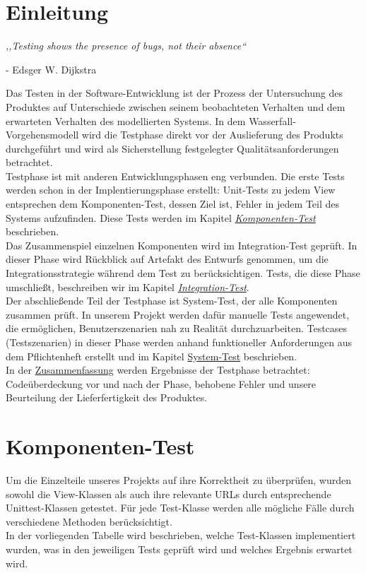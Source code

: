 \documentclass[parskip=full,11pt]{scrartcl}
\begin{document}
 \section{Einleitung}
\begin{center}
\textit{,,Testing shows the presence of bugs, not their absence``}
\end{center}
\begin{flushright}
- Edsger W. Dijkstra\\
\end{flushright}
Das Testen in der Software-Entwicklung ist der Prozess der Untersuchung des Produktes auf Unterschiede zwischen seinem beobachteten Verhalten und dem erwarteten Verhalten des modellierten Systems.
In dem Wasserfall-Vorgehensmodell wird die Testphase direkt vor der Auslieferung des Produkts durchgeführt und wird als Sicherstellung festgelegter Qualitätsanforderungen betrachtet.\\
Testphase ist mit anderen Entwicklungsphasen eng verbunden. Die erste Tests werden schon in der Implentierungsphase erstellt: Unit-Tests zu jedem View entsprechen dem Komponenten-Test, dessen Ziel ist, Fehler in jedem Teil des Systems aufzufinden. Diese Tests werden im Kapitel \hyperref[komponententest]{\textit{Komponenten-Test}} beschrieben.\\
Das Zusammenspiel einzelnen Komponenten wird im Integration-Test geprüft. In dieser Phase wird Rückblick auf Artefakt des Entwurfs genommen, um die Integrationsstrategie während dem Test zu berücksichtigen. Tests, die diese Phase umschließt, beschreiben wir im Kapitel \hyperref[integrationtest]{\textit{Integration-Test}}.\\
Der abschließende Teil der Testphase ist System-Test, der alle Komponenten zusammen prüft. In unserem Projekt werden dafür manuelle Tests angewendet, die ermöglichen, Benutzerszenarien nah zu Realität durchzuarbeiten. Testcases (Testszenarien) in dieser Phase werden anhand funktioneller Anforderungen aus dem Pflichtenheft erstellt und im Kapitel \hyperref[systemtest]{System-Test} beschrieben.\\
In der \hyperref[zusammenfassung]{Zusammenfassung} werden Ergebnisse der Testphase betrachtet: Codeüberdeckung vor und nach der Phase, behobene Fehler und unsere Beurteilung der Lieferfertigkeit des Produktes.
 \newpage
\section{Komponenten-Test} \label{komponententest}
Um die Einzelteile unseres Projekts auf ihre Korrektheit zu überprüfen, wurden sowohl die View-Klassen als auch ihre relevante URLs durch entsprechende Unittest-Klassen getestet. Für jede Test-Klasse werden alle mögliche Fälle durch verschiedene Methoden berücksichtigt.\\
In der vorliegenden Tabelle wird beschrieben, welche Test-Klassen implementiert wurden, was in den jeweiligen Tests geprüft wird und welches Ergebnis erwartet wird.
\end{document}
